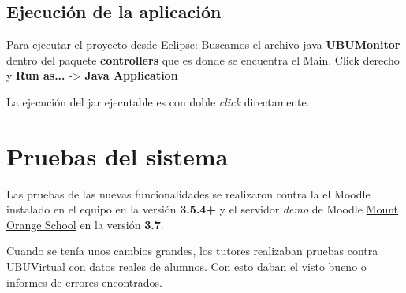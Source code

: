 \subsection{Ejecución de la aplicación}

Para ejecutar el proyecto desde Eclipse: Buscamos el archivo java \textbf{UBUMonitor} dentro del paquete \textbf{controllers} que es donde se encuentra el Main. Click derecho y \textbf{Run as...} -> \textbf{Java Application}


La ejecución del jar ejecutable es con doble \textit{click} directamente.
\section{Pruebas del sistema}

Las pruebas de las nuevas funcionalidades se realizaron contra la el Moodle instalado en el equipo en la versión \textbf{3.5.4+} y el servidor \textit{demo} de Moodle \href{https://school.demo.moodle.net}{Mount Orange School} en la versión \textbf{3.7}. 

Cuando se tenía unos cambios grandes, los tutores realizaban pruebas contra UBUVirtual con datos reales de alumnos. Con esto daban el visto bueno o informes de errores encontrados.
